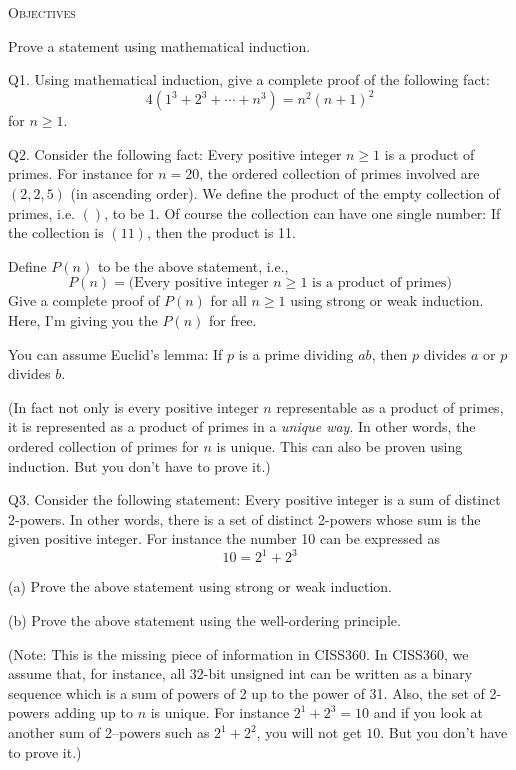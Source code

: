 


\renewcommand\TITLE{Assignment 2}


\topmatter

\textsc{Objectives}
\begin{itemize}
  \li Prove a statement using mathematical induction.
\end{itemize}

\newpage



\newpage
Q1.
Using mathematical induction, give a complete proof of the following fact:
\[
  4(1^3 + 2^3 + \cdots + n^3) = n^2(n+1)^2
\]
for $n \geq 1$.

\SOLUTION



  
\newpage



\newpage
Q2.
Consider the following fact:
Every positive integer $n \geq 1$ is a product of primes.
For instance for $n = 20$,
the ordered collection of primes involved are $(2, 2, 5)$ (in ascending order).
We define the product of the empty collection of primes, i.e. $()$, to be $1$.
Of course the collection can have one single number:
If the collection is $(11)$, then the product is 11.

Define $P(n)$ to be the above statement, i.e.,
\[
  P(n) =
  \biggl(
  \text{Every positive integer $n \geq 1$ is a product of primes}
  \biggr)
\]
Give a complete proof of $P(n)$ for all $n \geq 1$
using strong or weak induction.
Here, I'm giving you the $P(n)$ for free.

You can assume Euclid's lemma: If $p$ is a prime dividing $ab$,
then $p$ divides $a$ or $p$ divides $b$.

(In fact not only is every positive integer $n$ representable
as a product of primes,
it is represented as a product of primes in a \textit{unique way}.
In other words, the ordered collection of primes for $n$ is unique.
This can also be proven using induction.
But you don't have to prove it.)

\SOLUTION



  
\newpage
Q3.
Consider the following statement:
Every positive integer is a sum of distinct 2-powers.
In other words, there is a set of distinct 2-powers whose sum is the 
given positive integer.
For instance the number 10 can be expressed as
\[
10 = 2^1 + 2^3
\]

(a)
Prove the above statement using strong or weak induction.

(b)
Prove the above statement using the well-ordering principle.

(Note: This is the missing piece of information in CISS360.
In CISS360, we assume that, for instance, all 32-bit unsigned int
can be written as a binary sequence which is a sum of powers of 2
up to the power of 31.
Also, the set of 2-powers adding up to $n$ is unique.
For instance $2^1 + 2^3 = 10$ and if you look at another
sum of 2--powers such as $2^1 + 2^2$, you will not get $10$.
But you don't have to prove it.)

\SOLUTION




